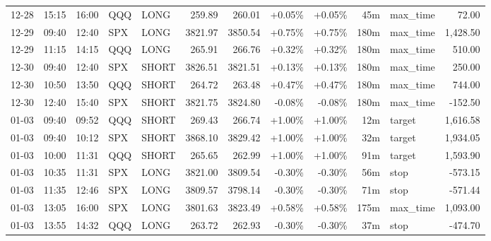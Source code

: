\documentclass[11pt,a4paper,twoside]{article}
\begin{document}
\begin{center}
\begin{longtable}{>{\color{txtmain}}l l l l l r r r r r >{\color{txtmain}}l r}
12-28 & 15:15 & 16:00 & QQQ & LONG & 259.89 & 260.01 & \textcolor{wingreen}{+0.05\%} & \textcolor{wingreen}{+0.05\%} & 45m & max\_time & \textcolor{wingreen}{72.00} \\
12-29 & 09:40 & 12:40 & SPX & LONG & 3821.97 & 3850.54 & \textcolor{wingreen}{+0.75\%} & \textcolor{wingreen}{+0.75\%} & 180m & max\_time & \textcolor{wingreen}{1,428.50} \\
12-29 & 11:15 & 14:15 & QQQ & LONG & 265.91 & 266.76 & \textcolor{wingreen}{+0.32\%} & \textcolor{wingreen}{+0.32\%} & 180m & max\_time & \textcolor{wingreen}{510.00} \\
12-30 & 09:40 & 12:40 & SPX & SHORT & 3826.51 & 3821.51 & \textcolor{wingreen}{+0.13\%} & \textcolor{wingreen}{+0.13\%} & 180m & max\_time & \textcolor{wingreen}{250.00} \\
12-30 & 10:50 & 13:50 & QQQ & SHORT & 264.72 & 263.48 & \textcolor{wingreen}{+0.47\%} & \textcolor{wingreen}{+0.47\%} & 180m & max\_time & \textcolor{wingreen}{744.00} \\
12-30 & 12:40 & 15:40 & SPX & SHORT & 3821.75 & 3824.80 & \textcolor{lossred}{-0.08\%} & \textcolor{lossred}{-0.08\%} & 180m & max\_time & \textcolor{lossred}{-152.50} \\
01-03 & 09:40 & 09:52 & QQQ & SHORT & 269.43 & 266.74 & \textcolor{wingreen}{+1.00\%} & \textcolor{wingreen}{+1.00\%} & 12m & target & \textcolor{wingreen}{1,616.58} \\
01-03 & 09:40 & 10:12 & SPX & SHORT & 3868.10 & 3829.42 & \textcolor{wingreen}{+1.00\%} & \textcolor{wingreen}{+1.00\%} & 32m & target & \textcolor{wingreen}{1,934.05} \\
01-03 & 10:00 & 11:31 & QQQ & SHORT & 265.65 & 262.99 & \textcolor{wingreen}{+1.00\%} & \textcolor{wingreen}{+1.00\%} & 91m & target & \textcolor{wingreen}{1,593.90} \\
01-03 & 10:35 & 11:31 & SPX & LONG & 3821.00 & 3809.54 & \textcolor{lossred}{-0.30\%} & \textcolor{lossred}{-0.30\%} & 56m & stop & \textcolor{lossred}{-573.15} \\
01-03 & 11:35 & 12:46 & SPX & LONG & 3809.57 & 3798.14 & \textcolor{lossred}{-0.30\%} & \textcolor{lossred}{-0.30\%} & 71m & stop & \textcolor{lossred}{-571.44} \\
01-03 & 13:05 & 16:00 & SPX & LONG & 3801.63 & 3823.49 & \textcolor{wingreen}{+0.58\%} & \textcolor{wingreen}{+0.58\%} & 175m & max\_time & \textcolor{wingreen}{1,093.00} \\
01-03 & 13:55 & 14:32 & QQQ & LONG & 263.72 & 262.93 & \textcolor{lossred}{-0.30\%} & \textcolor{lossred}{-0.30\%} & 37m & stop & \textcolor{lossred}{-474.70} \\

\end{longtable}
\end{center}
\end{document}
